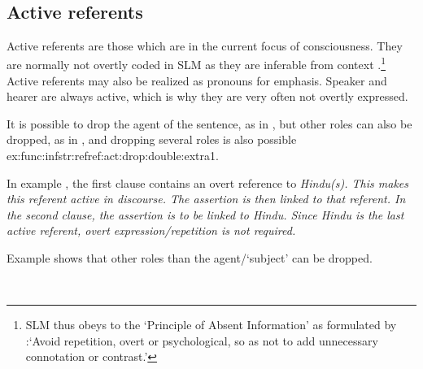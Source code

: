  \\


\subsection{Active referents}\label{sec:disc:Activereferents}
Active referents are those which are in the current focus of consciousness. They are normally not overtly coded in SLM as they are inferable from context \citep{SmithEtAl2004}.\footnote{SLM thus obeys to the `Principle of Absent Information' as formulated by \citet[305]{Minegishi2004}:`Avoid repetition, overt or psychological, so as not to add unnecessary connotation or contrast.'}   Active referents may also be realized as pronouns for emphasis. Speaker and hearer are always active, which is why they are very often not overtly expressed.

It is possible to drop the agent of the sentence, as in , but other roles can also be dropped, as in , and dropping several roles is also possible {ex:func:infstr:refref:act:drop:double:extra1}.



In example , the first clause contains an overt reference to \em Hindu(s)\em. This makes this referent active in discourse. The assertion  is then linked to that referent. In the second clause, the assertion  is to be linked to \em Hindu\em. Since \em Hindu \em is the last active referent, overt expression/repetition is not required.
 
Example  shows that other roles than the agent/`subject' can be dropped.

 \\

